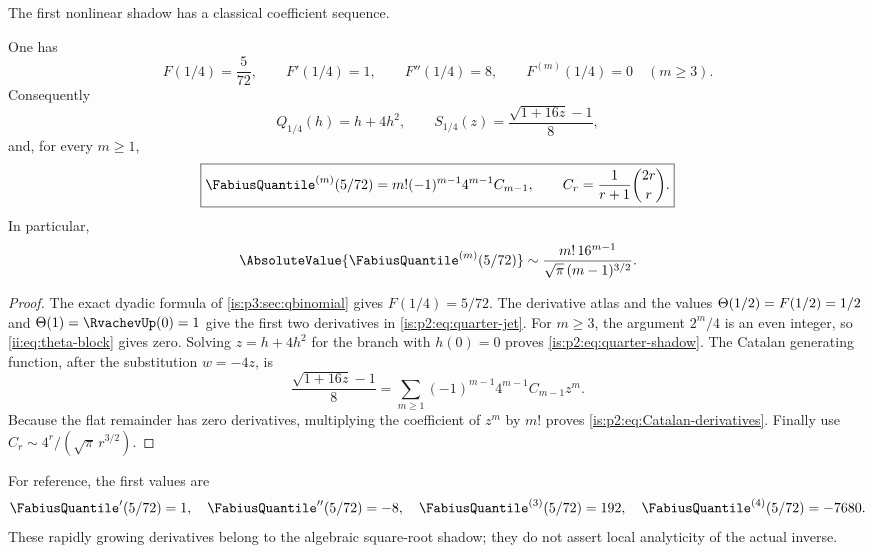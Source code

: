 The first nonlinear shadow has a classical coefficient sequence.

\begin{theorem}
\label{is:p2:thm:Catalan-quarter}
One has
\begin{equation}
 F(1/4)=\frac5{72},
 \qquad F'(1/4)=1,
 \qquad F''(1/4)=8,
 \qquad F^{(m)}(1/4)=0\quad(m\ge3).
 \label{is:p2:eq:quarter-jet}
\end{equation}
Consequently
\begin{equation}
 Q_{1/4}(h)=h+4h^2,
 \qquad
 S_{1/4}(z)=\frac{\sqrt{1+16z}-1}{8},
 \label{is:p2:eq:quarter-shadow}
\end{equation}
and, for every $m\ge1$,
\begin{equation}
 \boxed{
 \FabiusQuantile^{(m)}(5/72)
 =m!(-1)^{m-1}4^{m-1}C_{m-1},
 \qquad C_r=\frac1{r+1}\binom{2r}{r}.}
 \label{is:p2:eq:Catalan-derivatives}
\end{equation}
In particular,
\begin{equation}
 \AbsoluteValue{\FabiusQuantile^{(m)}(5/72)}
 \sim\frac{m!\,16^{m-1}}{\sqrt\pi\,(m-1)^{3/2}}.
 \label{is:p2:eq:Catalan-asymptotic}
\end{equation}
\end{theorem}

\begin{proof}
The exact dyadic formula of \cref{is:p3:sec:qbinomial} gives
$F(1/4)=5/72$.  The derivative atlas and the values
$\Theta(1/2)=F(1/2)=1/2$ and $\ThetaF(1)=\RvachevUp(0)=1$ give the first
two derivatives in \eqref{is:p2:eq:quarter-jet}.  For $m\ge3$, the argument
$2^m/4$ is an even integer, so \eqref{ii:eq:theta-block} gives zero.
Solving $z=h+4h^2$ for the branch with $h(0)=0$ proves
\eqref{is:p2:eq:quarter-shadow}.  The Catalan generating function, after
the substitution $w=-4z$, is
\[
 \frac{\sqrt{1+16z}-1}{8}
 =\sum_{m\ge1}(-1)^{m-1}4^{m-1}C_{m-1}z^m.
\]
Because the flat remainder has zero derivatives, multiplying the coefficient
of $z^m$ by $m!$ proves \eqref{is:p2:eq:Catalan-derivatives}.  Finally use
$C_r\sim4^r/(\sqrt\pi\,r^{3/2})$.
\end{proof}

For reference, the first values are
\[
 \FabiusQuantile'(5/72)=1,
 \quad \FabiusQuantile''(5/72)=-8,
 \quad \FabiusQuantile^{(3)}(5/72)=192,
 \quad \FabiusQuantile^{(4)}(5/72)=-7680.
\]
These rapidly growing derivatives belong to the algebraic square-root
shadow; they do not assert local analyticity of the actual inverse.


